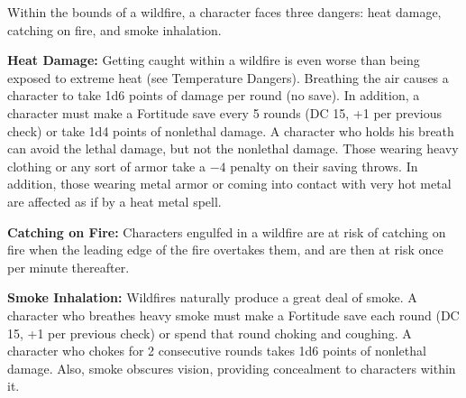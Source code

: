 Within the bounds of a wildfire, a character faces three dangers: heat damage, catching on fire, and smoke inhalation.

\textbf{Heat Damage:} Getting caught within a wildfire is even worse than being exposed to extreme heat (see Temperature Dangers). Breathing the air causes a character to take 1d6 points of damage per round (no save). In addition, a character must make a Fortitude save every 5 rounds (DC 15, +1 per previous check) or take 1d4 points of nonlethal damage. A character who holds his breath can avoid the lethal damage, but not the nonlethal damage. Those wearing heavy clothing or any sort of armor take a $-4$ penalty on their saving throws. In addition, those wearing metal armor or coming into contact with very hot metal are affected as if by a heat metal spell.

\textbf{Catching on Fire:} Characters engulfed in a wildfire are at risk of catching on fire when the leading edge of the fire overtakes them, and are then at risk once per minute thereafter.

\textbf{Smoke Inhalation:} Wildfires naturally produce a great deal of smoke. A character who breathes heavy smoke must make a Fortitude save each round (DC 15, +1 per previous check) or spend that round choking and coughing. A character who chokes for 2 consecutive rounds takes 1d6 points of nonlethal damage. Also, smoke obscures vision, providing concealment to characters within it.
